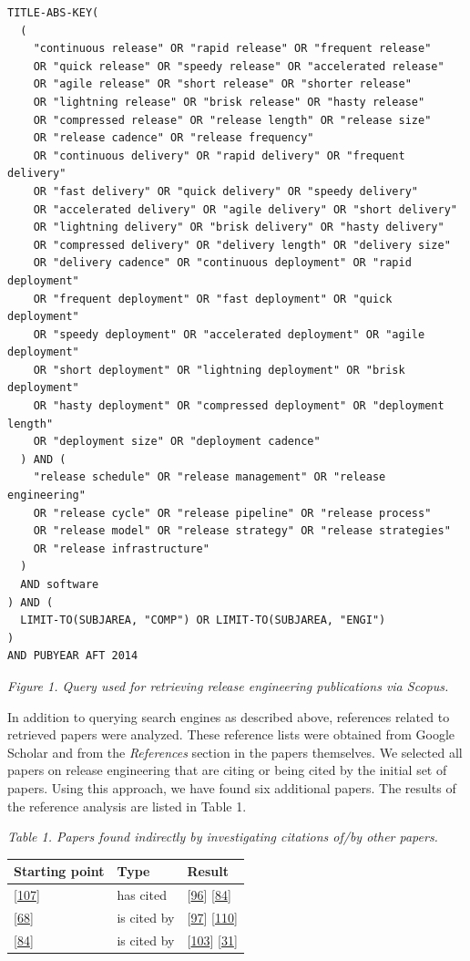 \documentclass[]{book}
\begin{document}
\begin{verbatim}
TITLE-ABS-KEY(
  (
    "continuous release" OR "rapid release" OR "frequent release"
    OR "quick release" OR "speedy release" OR "accelerated release"
    OR "agile release" OR "short release" OR "shorter release"
    OR "lightning release" OR "brisk release" OR "hasty release"
    OR "compressed release" OR "release length" OR "release size"
    OR "release cadence" OR "release frequency"
    OR "continuous delivery" OR "rapid delivery" OR "frequent delivery"
    OR "fast delivery" OR "quick delivery" OR "speedy delivery"
    OR "accelerated delivery" OR "agile delivery" OR "short delivery"
    OR "lightning delivery" OR "brisk delivery" OR "hasty delivery"
    OR "compressed delivery" OR "delivery length" OR "delivery size"
    OR "delivery cadence" OR "continuous deployment" OR "rapid deployment"
    OR "frequent deployment" OR "fast deployment" OR "quick deployment"
    OR "speedy deployment" OR "accelerated deployment" OR "agile deployment"
    OR "short deployment" OR "lightning deployment" OR "brisk deployment"
    OR "hasty deployment" OR "compressed deployment" OR "deployment length"
    OR "deployment size" OR "deployment cadence"
  ) AND (
    "release schedule" OR "release management" OR "release engineering"
    OR "release cycle" OR "release pipeline" OR "release process"
    OR "release model" OR "release strategy" OR "release strategies"
    OR "release infrastructure"
  )
  AND software
) AND (
  LIMIT-TO(SUBJAREA, "COMP") OR LIMIT-TO(SUBJAREA, "ENGI")
)
AND PUBYEAR AFT 2014
\end{verbatim}

\emph{Figure 1. Query used for retrieving release engineering
publications via Scopus.}

In addition to querying search engines as described above, references
related to retrieved papers were analyzed. These reference lists were
obtained from Google Scholar and from the \emph{References} section in
the papers themselves. We selected all papers on release engineering
that are citing or being cited by the initial set of papers. Using this
approach, we have found six additional papers. The results of the
reference analysis are listed in Table 1.

\emph{Table 1. Papers found indirectly by investigating citations of/by
other papers.}

\begin{longtable}[]{@{}lll@{}}
\toprule
Starting point & Type & Result\tabularnewline
\midrule
\endhead
{[}\protect\hyperlink{ref-souza2015a}{107}{]} & has cited &
{[}\protect\hyperlink{ref-plewnia2014a}{96}{]}
{[}\protect\hyperlink{ref-mantyla2015a}{84}{]}\tabularnewline
{[}\protect\hyperlink{ref-khomh2015a}{68}{]} & is cited by &
{[}\protect\hyperlink{ref-poo-caamano2016a}{97}{]}
{[}\protect\hyperlink{ref-teixeira2017a}{110}{]}\tabularnewline
{[}\protect\hyperlink{ref-mantyla2015a}{84}{]} & is cited by &
{[}\protect\hyperlink{ref-rodriguez2017a}{103}{]}
{[}\protect\hyperlink{ref-cesar2017a}{31}{]}\tabularnewline
\bottomrule
\end{longtable}
\end{document}

